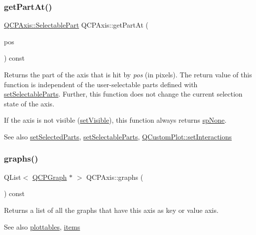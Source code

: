 \subsubsection{\texorpdfstring{get\+Part\+At()}{getPartAt()}}
{\footnotesize\ttfamily \hyperlink{class_q_c_p_axis_abee4c7a54c468b1385dfce2c898b115f}{Q\+C\+P\+Axis\+::\+Selectable\+Part} Q\+C\+P\+Axis\+::get\+Part\+At (\begin{DoxyParamCaption}\item[{const Q\+PointF \&}]{pos }\end{DoxyParamCaption}) const}

Returns the part of the axis that is hit by {\itshape pos} (in pixels). The return value of this function is independent of the user-\/selectable parts defined with \hyperlink{class_q_c_p_axis_a513f9b9e326c505d9bec54880031b085}{set\+Selectable\+Parts}. Further, this function does not change the current selection state of the axis.

If the axis is not visible (\hyperlink{class_q_c_p_layerable_a3bed99ddc396b48ce3ebfdc0418744f8}{set\+Visible}), this function always returns \hyperlink{class_q_c_p_axis_abee4c7a54c468b1385dfce2c898b115fae0df8123a5528d5ccf87cb7794f971ea}{sp\+None}.

\begin{DoxySeeAlso}{See also}
\hyperlink{class_q_c_p_axis_ab9d7a69277dcbed9119b3c1f25ca19c3}{set\+Selected\+Parts}, \hyperlink{class_q_c_p_axis_a513f9b9e326c505d9bec54880031b085}{set\+Selectable\+Parts}, \hyperlink{class_q_custom_plot_a5ee1e2f6ae27419deca53e75907c27e5}{Q\+Custom\+Plot\+::set\+Interactions} 
\end{DoxySeeAlso}
\mbox{\label{class_q_c_p_axis_ad590c0da223697a2727f97a520870fec}} 
\subsubsection{\texorpdfstring{graphs()}{graphs()}}
{\footnotesize\ttfamily Q\+List$<$ \hyperlink{class_q_c_p_graph}{Q\+C\+P\+Graph} $\ast$ $>$ Q\+C\+P\+Axis\+::graphs (\begin{DoxyParamCaption}{ }\end{DoxyParamCaption}) const}

Returns a list of all the graphs that have this axis as key or value axis.

\begin{DoxySeeAlso}{See also}
\hyperlink{class_q_c_p_axis_ac5e0f6f65c75efb5fd32275d6e4ef0d6}{plottables}, \hyperlink{class_q_c_p_axis_a42761bc68e2f3a9f68549d45b73f705b}{items} 
\end{DoxySeeAlso}
\mbox{\label{class_q_c_p_axis_a63f1dd2df663680d2a8d06c19592dd63}} 
